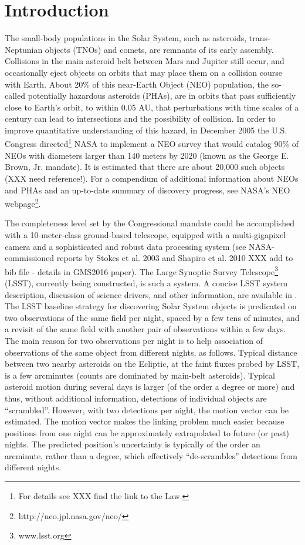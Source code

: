 
\section{Introduction}

The small-body populations in the Solar System, such as asteroids, trans-Neptunian objects (TNOs) 
and comets, are remnants of its early assembly. Collisions in the main asteroid belt between Mars and 
Jupiter still occur, and occasionally eject objects on orbits that may place them on a collision course 
with Earth. About 20\% of this near-Earth Object (NEO) population, the so-called potentially hazardous 
asteroids (PHAs), are in orbits that pass sufficiently close to Earth's orbit, to within 0.05 AU, that 
perturbations with time scales of a century can lead to intersections and the possibility of collision. 
In order to improve quantitative understanding of this hazard, in December 2005 the U.S. Congress
directed\footnote{For details see XXX find the link to the Law.} NASA to implement a NEO survey that 
would catalog 90\% of NEOs with diameters larger than 140 meters by 2020 (known as the George 
E. Brown, Jr. mandate). It is estimated that there are about 20,000 such objects (XXX need reference!). 
For a compendium of additional information about NEOs and PHAs and an up-to-date summary of 
discovery progress, see NASA's NEO webpage\footnote{http://neo.jpl.nasa.gov/neo/}. 

The completeness level set by the Congressional mandate could be accomplished with a 10-meter-class 
ground-based telescope, equipped with a multi-gigapixel camera and a sophisticated and robust data 
processing system (see NASA-commissioned reports by Stokes et al. 2003 and Shapiro et al. 2010 
XXX add to bib file - details in GMS2016 paper). The Large Synoptic Survey Telescope\footnote{www.lsst.org} (LSST), currently being 
constructed, is such a system. A concise LSST system description, discussion of science drivers, and other 
information, are available in \cite{LSSToverview}. The LSST baseline strategy for discovering Solar System 
objects is predicated on two observations of the same field per night, spaced by a few tens of minutes, and 
a revisit of the same field with another pair of observations within a few days. The main reason for two
observations per night is to help association of observations of the same object from different nights, 
as follows. Typical distance between two nearby asteroids on the Ecliptic, at the faint fluxes probed by 
LSST, is a few arcminutes (counts are dominated by main-belt asteroids). Typical asteroid motion
during several days is larger (of the order a degree or more) and thus, without additional information, 
detections of individual objects are ``scrambled''. However, with two detections per night, the motion 
vector can be estimated. The motion vector makes the linking problem much easier because
positions from one night can be approximately extrapolated to future (or past) nights. The predicted
position's uncertainty is typically of the order an arcminute, rather than a degree, which effectively 
``de-scrambles'' detections from different nights.  


